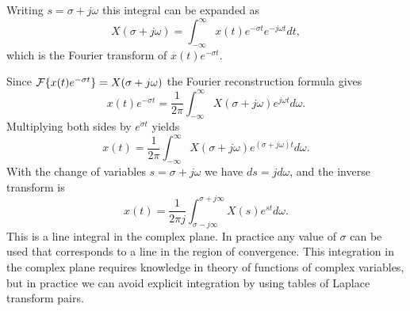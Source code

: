 \documentclass[10pt]{beamer}
\begin{document}
Writing $s = \sigma + j \omega$ this integral can be expanded as
\begin{equation*}
  X(\sigma + j \omega) = \int_{-\infty}^{\infty} x(t) e^{- \sigma t} e^{-j \omega t} dt,
\end{equation*}
which is the Fourier transform of $x(t) e^{- \sigma t}$.  

Since ${\cal F} \{ x(t) e^{- \sigma t} \} = X(\sigma + j \omega)$ the Fourier reconstruction formula gives
\begin{equation*}
  x(t) e^{- \sigma t} = \frac{1}{2\pi} \int_{-\infty}^{\infty} X(\sigma + j \omega) e^{j \omega t} d\omega.
\end{equation*}
Multiplying both sides by $e^{\sigma t}$ yields
\begin{equation*}
  x(t) = \frac{1}{2\pi} \int_{-\infty}^{\infty} X(\sigma + j \omega) e^{(\sigma + j \omega) t} d\omega.
\end{equation*}
With the change of variables $s = \sigma + j \omega$ we have $ds = j d\omega$, and the inverse transform is
\begin{equation*}
  x(t) = \frac{1}{2\pi j} \int_{\sigma-j \infty}^{\sigma+j \infty} X(s) e^{s t} d\omega.
\end{equation*}
This is a line integral in the complex plane.  In practice any value of $\sigma$ can be used that corresponds to a line in the region of convergence.  This integration in the complex plane requires knowledge in theory of functions of complex variables, but in practice we can avoid explicit integration by using tables of Laplace transform pairs.
\end{document}
